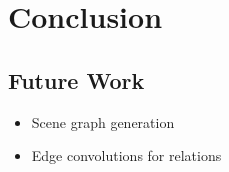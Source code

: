 \chapter{Conclusion}

\section{Future Work}

\begin{itemize}
  \item Scene graph generation
  \item Edge convolutions for relations
\end{itemize}
